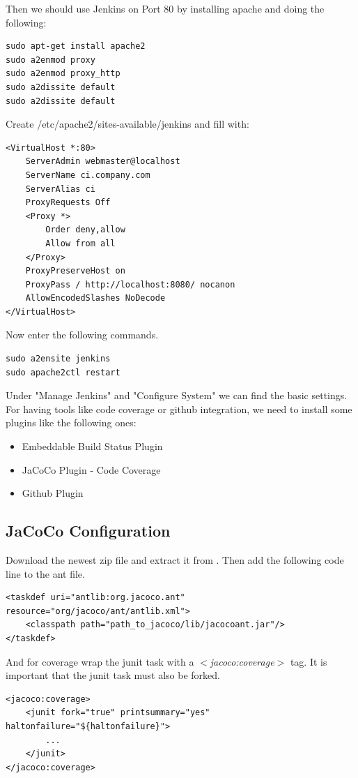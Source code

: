 \documentclass[11pt, a4paper]{article}
\begin{document}
Then we should use Jenkins on Port 80 by installing apache and doing the following:

\begin{lstlisting}
sudo apt-get install apache2
sudo a2enmod proxy
sudo a2enmod proxy_http
sudo a2dissite default
sudo a2dissite default
\end{lstlisting}

Create /etc/apache2/sites-available/jenkins and fill with:
\begin{lstlisting}
<VirtualHost *:80>
	ServerAdmin webmaster@localhost
	ServerName ci.company.com
	ServerAlias ci
	ProxyRequests Off
	<Proxy *>
		Order deny,allow
		Allow from all
	</Proxy>
	ProxyPreserveHost on
	ProxyPass / http://localhost:8080/ nocanon
	AllowEncodedSlashes NoDecode
</VirtualHost> 
\end{lstlisting}


Now enter the following commands. 

\begin{lstlisting}
sudo a2ensite jenkins
sudo apache2ctl restart
\end{lstlisting}


Under "Manage Jenkins" and "Configure System" we can find the basic settings.
For having tools like code coverage or github integration, we need to install some plugins like the following ones:

\begin{itemize}
\item Embeddable Build Status Plugin
\item JaCoCo Plugin - Code Coverage
\item Github Plugin
\end{itemize}

\subsection{JaCoCo Configuration}

Download the newest zip file and extract it from \cite{jacoco:download}. Then add the following code line to the ant file.

\begin{lstlisting}
<taskdef uri="antlib:org.jacoco.ant" resource="org/jacoco/ant/antlib.xml">
	<classpath path="path_to_jacoco/lib/jacocoant.jar"/>
</taskdef>	   
\end{lstlisting}


And for coverage wrap the junit task with a \textit{$<$jacoco:coverage$>$} tag. It is important that the junit task must also be forked. 
\begin{lstlisting}
<jacoco:coverage>
	<junit fork="true" printsummary="yes" haltonfailure="${haltonfailure}">
		...
	</junit>
</jacoco:coverage>
\end{lstlisting}

\nocite{*}

{}
\end{document}
